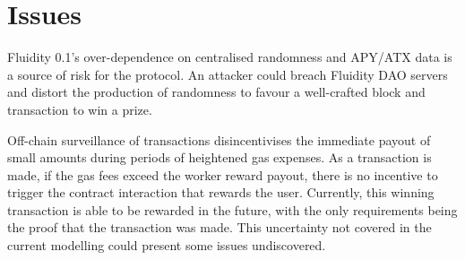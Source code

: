 
\section{Issues}

Fluidity 0.1's over-dependence on centralised randomness and APY/ATX data is a source of risk for the protocol. An attacker could breach Fluidity DAO servers and distort the production of randomness to favour a well-crafted block and transaction to win a prize.

Off-chain surveillance of transactions disincentivises the immediate payout of small amounts during periods of heightened gas expenses. As a transaction is made, if the gas fees exceed the worker reward payout, there is no incentive to trigger the contract interaction that rewards the user. Currently, this winning transaction is able to be rewarded in the future, with the only requirements being the proof that the transaction was made. This uncertainty not covered in the current modelling could present some issues undiscovered.

